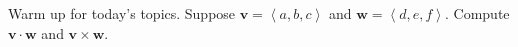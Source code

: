 Warm up for today's topics.  Suppose $\mathbf{v}=\left<a,b,c\right>$ and $\mathbf{w}=\left<d,e,f\right>$.  Compute $\mathbf{v}\cdot\mathbf{w}$ and $\mathbf{v}\times\mathbf{w}$.